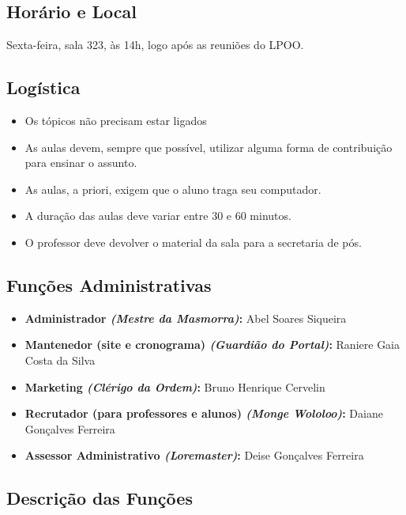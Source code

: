 \documentclass[a4paper,11pt]{report}
\numberwithin{equation}{section}
\begin{document}
\subsection{ Horário e Local }

Sexta-feira, sala 323, às 14h, logo após as reuniões do LPOO.

\subsection{ Logística }

\begin{itemize}
  \item Os tópicos não precisam estar ligados
  \item As aulas devem, sempre que possível, utilizar alguma forma de contribuição para ensinar o assunto.
  \item As aulas, a priori, exigem que o aluno traga seu computador.
  \item A duração das aulas deve variar entre 30 e 60 minutos.
  \item O professor deve devolver o material da sala para a secretaria de pós.
\end{itemize}

\subsection{ Funções Administrativas }

\begin{itemize}
  \item {\bf Administrador {\it (Mestre da Masmorra)}:} Abel Soares Siqueira
  \item {\bf Mantenedor (site e cronograma) {\it (Guardião do Portal)}:} 
    Raniere Gaia Costa da Silva
  \item {\bf Marketing {\it (Clérigo da Ordem)}:} Bruno Henrique Cervelin
  \item {\bf Recrutador (para professores e alunos) {\it (Monge Wololoo)}:} 
    Daiane Gonçalves Ferreira
  \item {\bf Assessor Administrativo {\it (Loremaster)}:} Deise Gonçalves Ferreira
\end{itemize}

\subsection{ Descrição das Funções }
\end{document}
